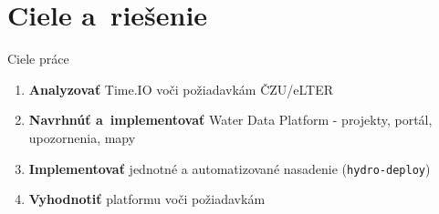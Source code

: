 \documentclass[]{beamer}
\begin{document}
\section{Ciele a~riešenie}

\begin{frame}{Ciele práce}
\begin{enumerate}
  \item \textbf{Analyzovať} Time.IO voči požiadavkám ČZU/eLTER
  \item \textbf{Navrhnúť a~implementovať} Water Data Platform
        - projekty, portál, upozornenia, mapy
  \item \textbf{Implementovať} jednotné a automatizované nasadenie
        (\texttt{hydro-deploy})
  \item \textbf{Vyhodnotiť} platformu voči požiadavkám
\end{enumerate}
\end{frame}
\end{document}
